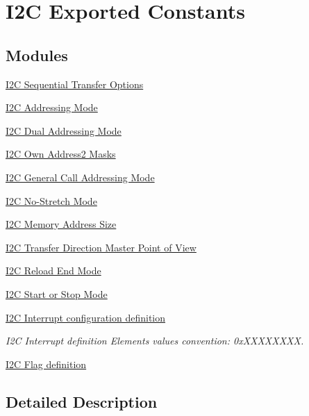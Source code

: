 \hypertarget{group___i2_c___exported___constants}{}\section{I2C Exported Constants}
\label{group___i2_c___exported___constants}
\subsection*{Modules}
\begin{DoxyCompactItemize}
\item 
\hyperlink{group___i2_c___x_f_e_r_o_p_t_i_o_n_s}{I2\+C Sequential Transfer Options}
\item 
\hyperlink{group___i2_c___a_d_d_r_e_s_s_i_n_g___m_o_d_e}{I2\+C Addressing Mode}
\item 
\hyperlink{group___i2_c___d_u_a_l___a_d_d_r_e_s_s_i_n_g___m_o_d_e}{I2\+C Dual Addressing Mode}
\item 
\hyperlink{group___i2_c___o_w_n___a_d_d_r_e_s_s2___m_a_s_k_s}{I2\+C Own Address2 Masks}
\item 
\hyperlink{group___i2_c___g_e_n_e_r_a_l___c_a_l_l___a_d_d_r_e_s_s_i_n_g___m_o_d_e}{I2\+C General Call Addressing Mode}
\item 
\hyperlink{group___i2_c___n_o_s_t_r_e_t_c_h___m_o_d_e}{I2\+C No-\/\+Stretch Mode}
\item 
\hyperlink{group___i2_c___m_e_m_o_r_y___a_d_d_r_e_s_s___s_i_z_e}{I2\+C Memory Address Size}
\item 
\hyperlink{group___i2_c___x_f_e_r_d_i_r_e_c_t_i_o_n}{I2\+C Transfer Direction Master Point of View}
\item 
\hyperlink{group___i2_c___r_e_l_o_a_d___e_n_d___m_o_d_e}{I2\+C Reload End Mode}
\item 
\hyperlink{group___i2_c___s_t_a_r_t___s_t_o_p___m_o_d_e}{I2\+C Start or Stop Mode}
\item 
\hyperlink{group___i2_c___interrupt__configuration__definition}{I2\+C Interrupt configuration definition}
\begin{DoxyCompactList}\small\item\em I2C Interrupt definition Elements values convention\+: 0x\+X\+X\+X\+X\+X\+X\+XX. \end{DoxyCompactList}\item 
\hyperlink{group___i2_c___flag__definition}{I2\+C Flag definition}
\end{DoxyCompactItemize}


\subsection{Detailed Description}

